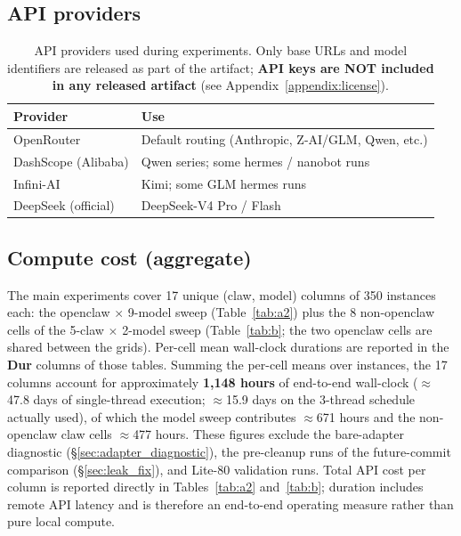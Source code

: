 \documentclass{llmxive}
\begin{document}
\subsection{API providers}

\begin{table}[!htbp]
\centering
\small
\begin{tabular}{ll}
\toprule
\textbf{Provider} & \textbf{Use} \\
\midrule
OpenRouter           & Default routing (Anthropic, Z-AI/GLM, Qwen, etc.) \\
DashScope (Alibaba)  & Qwen series; some hermes / nanobot runs \\
Infini-AI            & Kimi; some GLM hermes runs \\
DeepSeek (official)  & DeepSeek-V4 Pro / Flash \\
\bottomrule
\end{tabular}
\caption{API providers used during experiments. Only base URLs and model
identifiers are released as part of the artifact; \textbf{API keys are NOT
included in any released artifact} (see Appendix~\ref{appendix:license}).}
\label{tab:appx-d-providers}
\end{table}

\subsection{ Compute cost (aggregate)}

The main experiments cover 17 unique (claw, model) columns of 350 instances
each: the openclaw $\times$ 9-model sweep (Table~\ref{tab:a2}) plus the 8
non-openclaw cells of the 5-claw $\times$ 2-model sweep
(Table~\ref{tab:b}; the two openclaw cells are shared between the grids).
Per-cell mean wall-clock durations are reported in the \textbf{Dur} columns of
those tables. Summing the per-cell means over instances, the 17 columns
account for approximately \textbf{1{,}148 hours} of end-to-end wall-clock
($\approx$47.8 days of single-thread execution; $\approx$15.9 days on the
3-thread schedule actually used), of which the model sweep contributes
$\approx$671 hours and the non-openclaw claw cells $\approx$477 hours. These
figures exclude the bare-adapter diagnostic (\S\ref{sec:adapter_diagnostic}),
the pre-cleanup runs of the future-commit comparison (\S\ref{sec:leak_fix}),
and Lite-80 validation runs. Total API cost per column is reported directly in
Tables~\ref{tab:a2} and~\ref{tab:b}; duration includes remote API latency and
is therefore an end-to-end operating measure rather than pure local compute.
\end{document}
